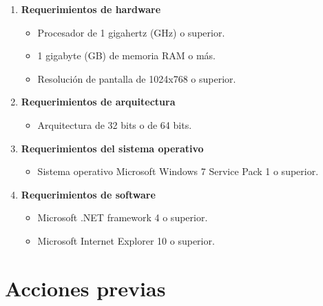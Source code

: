 \begin{enumerate}
	\item \textbf{Requerimientos de hardware}
	
	\begin{itemize}
		\item Procesador de 1 gigahertz (GHz) o superior.
		
		\item 1 gigabyte (GB) de memoria RAM o m\'{a}s.
		
		\item Resoluci\'{o}n de pantalla de 1024x768 o superior.
	\end{itemize}
	
	\item \textbf{Requerimientos de arquitectura}
	
	\begin{itemize}
		\item Arquitectura de 32 bits o de 64 bits.
	\end{itemize}
	
	\item \textbf{Requerimientos del sistema operativo}
	
	\begin{itemize}
		\item Sistema operativo Microsoft Windows 7 Service Pack 1 o superior.
	\end{itemize}
	
	\item \textbf{Requerimientos de software}
	
	\begin{itemize}
		\item Microsoft .NET framework 4 o superior.
		
		\item Microsoft Internet Explorer 10 o superior.
	\end{itemize}
	
\end{enumerate}

\newpage

\section*{Acciones previas}


